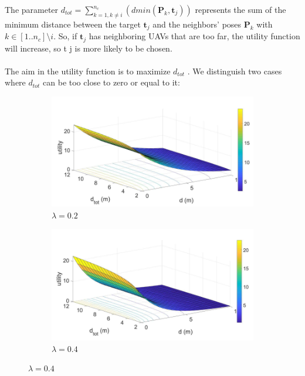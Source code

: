 \documentclass[11pt,openany]{book}
\begin{document}
The parameter $d_{tot} = \sum_{k=1, k\neq i}^{n_c}(dmin(\mathbf{P}_k,\mathbf{t}_j)) $ represents the sum of the minimum distance between the target $\mathbf{t}_j$ and the neighbors’ poses $\mathbf{P}_k$ with $k \in [1..n_c]\setminus i$. So, if $\mathbf{t}_j$ has neighboring UAVs that are too far, the utility function will increase, so t j is more likely to be chosen.\\\\
The aim in the utility function is to maximize $d_{tot}$ . We distinguish two cases where $d_{tot}$ can be too close to zero or equal to it:
\begin{figure}[H]
    \centering
    \begin{subfigure}[H]{0.4\linewidth}
        \centering
        \includegraphics[width=\linewidth]{assets/3_8_a.png}
        \caption{{$\lambda=0.2$}}
        \label{fig:3.8a}
    \end{subfigure}
    \begin{subfigure}[H]{0.4\linewidth}
        \centering
        \includegraphics[width=\linewidth]{assets/3_8_b.png}
        \caption{{$\lambda=0.4$}}
        \label{fig:3.8b}
    \end{subfigure}

\end{figure}
\end{document}
